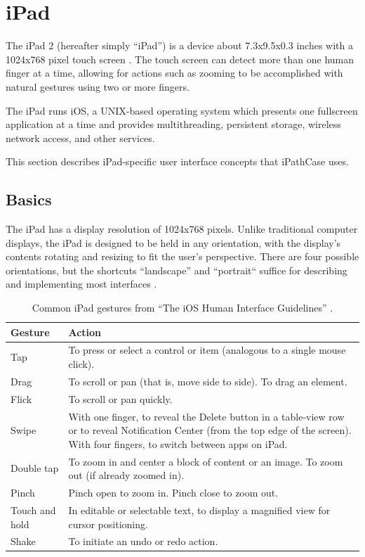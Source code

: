 \section{iPad} \label{sect:ipad}

The iPad 2 (hereafter simply ``iPad'') is a device about 7.3x9.5x0.3 inches with
a 1024x768 pixel touch screen \cite{ipad:specs}. The touch screen can detect
more than one human finger at a time, allowing for actions such as zooming to be
accomplished with natural gestures using two or more fingers.

The iPad runs iOS, a UNIX-based operating system which presents one fullscreen
application at a time and provides multithreading, persistent storage, wireless
network access, and other services.

This section describes iPad-specific user interface concepts that iPathCase
uses.

\subsection{Basics}
\label{sect:ipad_basics}

The iPad has a display resolution of 1024x768 pixels. Unlike traditional
computer displays, the iPad is designed to be held in any orientation, with the
display's contents rotating and resizing to fit the user's perspective. There
are four possible orientations, but the shortcuts ``landscape'' and ``portrait``
suffice for describing and implementing most interfaces \cite{ios:hig}.

\begin{table}[ht!]
    \centering
    \begin{tabular}{ | p{1in} | p{3in} | }
        \hline
        Gesture & Action
        \\ \hline
        Tap & To press or select a control or item (analogous to a single mouse click).
        \\ \hline
        Drag & To scroll or pan (that is, move side to side). To drag an element.
        \\ \hline
        Flick & To scroll or pan quickly.
        \\ \hline
        Swipe & With one finger, to reveal the Delete button in a table-view row or to reveal Notification Center (from the top edge of the screen).  With four fingers, to switch between apps on iPad.
        \\ \hline
        Double tap & To zoom in and center a block of content or an image.  To zoom out (if already zoomed in).
        \\ \hline
        Pinch & Pinch open to zoom in.  Pinch close to zoom out.
        \\ \hline
        Touch and hold & In editable or selectable text, to display a magnified view for cursor positioning.
        \\ \hline
        Shake & To initiate an undo or redo action.
        \\ \hline
    \end{tabular}
    \caption{\label{table:ipad_gestures}Common iPad gestures from ``The iOS Human Interface Guidelines''
    \cite{ios:hig}.}
\end{table}

